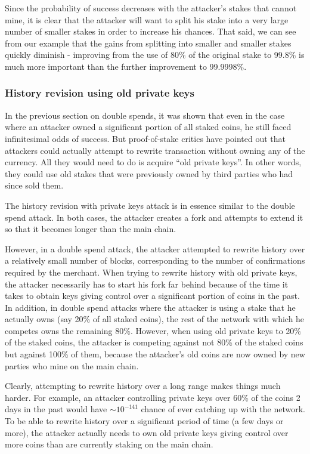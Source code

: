 \documentclass[a4paper,11pt]{article}
\begin{document}
Since the probability of success decreases with the attacker's stakes that cannot mine, it is clear that the attacker will want to split his stake into a very large number of smaller stakes in order to increase his chances. That said, we can see from our example that the gains from splitting into smaller and smaller stakes quickly diminish - improving from the use of 80\% of the original stake to 99.8\% is much more important than the further improvement to 99.9998\%.



\subsubsection{History revision using old private keys}
\label{332}

In the previous section on double spends, it was shown that even in the case where an attacker owned a significant portion of all staked coins, he still faced infinitesimal odds of success. But proof-of-stake critics have pointed out that attackers could actually attempt to rewrite transaction without owning any of the currency. All they would need to do is acquire ``old private keys''. In other words, they could use old stakes that were previously owned by third parties who had since sold them. 

The history revision with private keys attack is in essence similar to the double spend attack. In both cases, the attacker creates a fork and attempts to extend it so that it becomes longer than the main chain.

However, in a double spend attack, the attacker attempted to rewrite history over a relatively small number of blocks, corresponding to the number of confirmations required by the merchant. When trying to rewrite history with old private keys, the attacker necessarily has to start his fork far behind because of the time it takes to obtain keys giving control over a significant portion of coins in the past. In addition, in double spend attacks where the attacker is using a stake that he actually owns (say 20\% of all staked coins), the rest of the network with which he competes owns the remaining 80\%. However, when using old private keys to 20\% of the staked coins, the attacker is competing against not 80\% of the staked coins but against 100\% of them, because the attacker's old coins are now owned by new parties who mine on the main chain.

Clearly, attempting to rewrite history over a long range makes things much harder. For example, an attacker controlling private keys over 60\% of the coins 2 days in the past would have $\sim10^{-141}$ chance of ever catching up with the network.
To be able to rewrite history over a significant period of time (a few days or more), the attacker actually needs to own old private keys giving control over more coins than are currently staking on the main chain.
\end{document}
